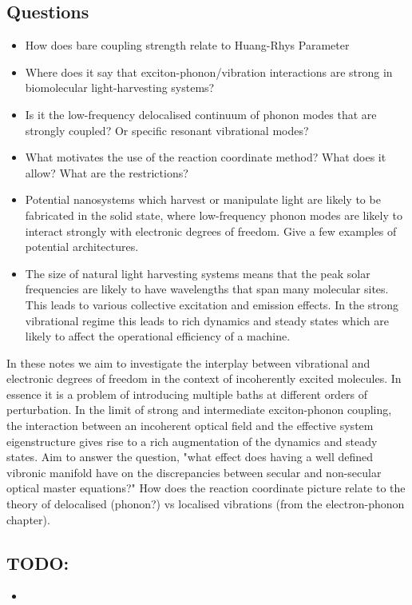 \documentclass[]{article}
\begin{document}
\subsection{Questions}
\begin{itemize}
	\item How does bare coupling strength relate to Huang-Rhys Parameter
	\item Where does it say that exciton-phonon/vibration interactions are strong in biomolecular light-harvesting systems?
	\item Is it the low-frequency delocalised continuum of phonon modes that are strongly coupled? Or specific resonant vibrational modes?
	\item What motivates the use of the reaction coordinate method? What does it allow? What are the restrictions?
	\item Potential nanosystems which harvest or manipulate light are likely to be fabricated in the solid state, where low-frequency phonon modes are likely to interact strongly with electronic degrees of freedom. Give a few examples of potential architectures.
	\item The size of natural light harvesting systems means that the peak solar frequencies are likely to have wavelengths that span many molecular sites. This leads to various collective excitation and emission effects. In the strong vibrational regime this leads to rich dynamics and steady states which are likely to affect the operational efficiency of a machine.
\end{itemize}
In these notes we aim to investigate the interplay between vibrational and electronic degrees of freedom in the context of incoherently excited molecules. In essence it is a problem of introducing multiple baths at different orders of perturbation. In the limit of strong and intermediate exciton-phonon coupling, the interaction between an incoherent optical field and the effective system eigenstructure gives rise to a rich augmentation of the dynamics and steady states. Aim to answer the question, "what effect does having a well defined vibronic manifold have on the discrepancies between secular and non-secular optical master equations?" How does the reaction coordinate picture relate to the theory of delocalised (phonon?) vs localised vibrations (from the electron-phonon chapter). 

\subsection{TODO:}
\begin{itemize}
	\item 
\end{itemize}
\end{document}

